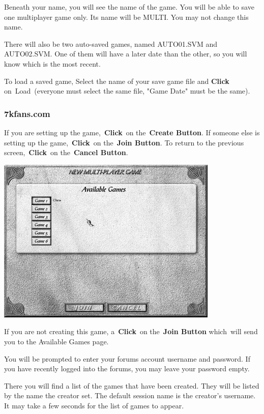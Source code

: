 Beneath your name, you will see the name of the game. You will be able to save one multiplayer game only. Its name will be MULTI. You may not change this name.

There will also be two auto-saved games, named AUTO01.SVM and AUTO02.SVM. One of them will have a later date than the other, so you will know which is the most recent.

To load a saved game, Select the name of your save game file and \textbf{Click} on Load (everyone must select the same file, "Game Date" must be the same).

\subsubsection{7kfans.com}

If you are setting up the game, \textbf{Click} on the \textbf{Create Button}. If someone else is setting up the game, \textbf{Click} on the \textbf{Join Button}. To return to the previous screen, \textbf{Click} on the \textbf{Cancel Button}.

\begin{center}
	\includegraphics[width=0.7\linewidth]{Imultiplayer2}
\end{center}

If you are not creating this game, a \textbf{Click} on the \textbf{Join Button} which will send you to the Available Games page.

You will be prompted to enter your forums account username and password. If you have recently logged into the forums, you may leave your password empty.

There you will find a list of the games that have been created. They will be listed by the name the creator set. The default session name is the creator’s username. It may take a few seconds for the list of games to appear.

